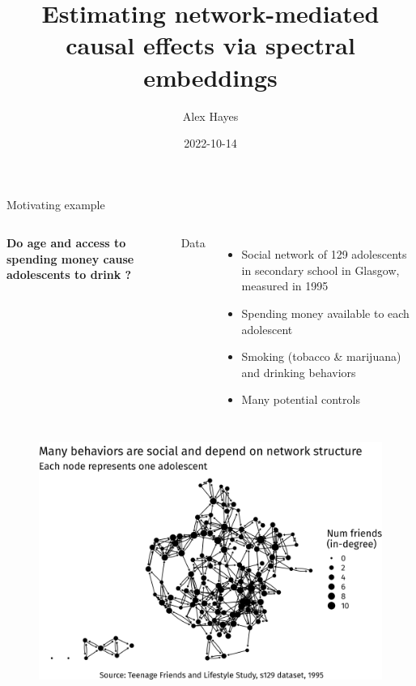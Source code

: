 \documentclass{beamer}
\title{Estimating network-mediated causal effects via spectral embeddings}
\date{2022-10-14}
\author{Alex Hayes}
\institute{University of Wisconsin-Madison}
\theoremstyle{remark}
\begin{document}
\maketitle

\begin{frame}{Motivating example}

    \begin{columns}


        \textbf{Do age and access to spending money cause adolescents to drink ?}


        Data

        \begin{itemize}
            \item Social network of 129 adolescents in secondary school in Glasgow, measured in 1995
            \item Spending money available to each adolescent
            \item Smoking (tobacco \& marijuana) and drinking behaviors
            \item Many potential controls
        \end{itemize}

    \end{columns}

\end{frame}

\begin{frame}
    \centering
    \vspace{3mm}
    \begin{figure}
        \includegraphics[width=\textwidth]{figures/glasgow-degree.png}
    \end{figure}

\end{frame}
\end{document}
